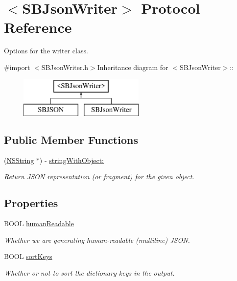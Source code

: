 \hypertarget{protocol_s_b_json_writer-p}{
\section{$<$SBJsonWriter$>$ Protocol Reference}
\label{protocol_s_b_json_writer-p}
}


Options for the writer class.  


{\ttfamily \#import $<$SBJsonWriter.h$>$}Inheritance diagram for $<$SBJsonWriter$>$::\begin{figure}[H]
\begin{center}
\leavevmode
\includegraphics[height=2cm]{protocol_s_b_json_writer-p}
\end{center}
\end{figure}
\subsection*{Public Member Functions}
\begin{DoxyCompactItemize}
\item 
(\hyperlink{class_n_s_string}{NSString} $\ast$) -\/ \hyperlink{protocol_s_b_json_writer-p_a675b15e830d510b7fcd72f4e0a89ec45}{stringWithObject:}
\begin{DoxyCompactList}\small\item\em Return JSON representation (or fragment) for the given object. \item\end{DoxyCompactList}\end{DoxyCompactItemize}
\subsection*{Properties}
\begin{DoxyCompactItemize}
\item 
BOOL \hyperlink{protocol_s_b_json_writer-p_a69f531597668b4b3c20aabee1e3d4558}{humanReadable}
\begin{DoxyCompactList}\small\item\em Whether we are generating human-\/readable (multiline) JSON. \item\end{DoxyCompactList}\item 
BOOL \hyperlink{protocol_s_b_json_writer-p_ad424f1c19aead35d04509bfa549f7290}{sortKeys}
\begin{DoxyCompactList}\small\item\em Whether or not to sort the dictionary keys in the output. \item\end{DoxyCompactList}\end{DoxyCompactItemize}


